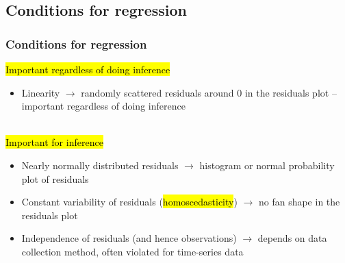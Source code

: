 \documentclass[11pt,containsverbatim,handout,xcolor=xelatex,dvipsnames,table]{beamer}
\begin{document}

\subsection{Conditions for regression}
\label{mi5}


\begin{frame}
\frametitle{Conditions for regression}

\hl{Important regardless of doing inference}

\begin{itemize}

\item Linearity $\rightarrow$ randomly scattered residuals around 0 in the residuals plot -- important regardless of doing inference

\end{itemize}

\pause

$\:$ \\

\hl{Important for inference}

\begin{itemize}

\item Nearly normally distributed residuals $\rightarrow$ histogram or normal probability plot of residuals

\pause

\item Constant variability of residuals (\hl{homoscedasticity}) $\rightarrow$ no fan shape in the residuals plot

\pause

\item Independence of residuals (and hence observations) $\rightarrow$ depends on data collection method, often violated for time-series data

\end{itemize}

\end{frame}

\end{document}
